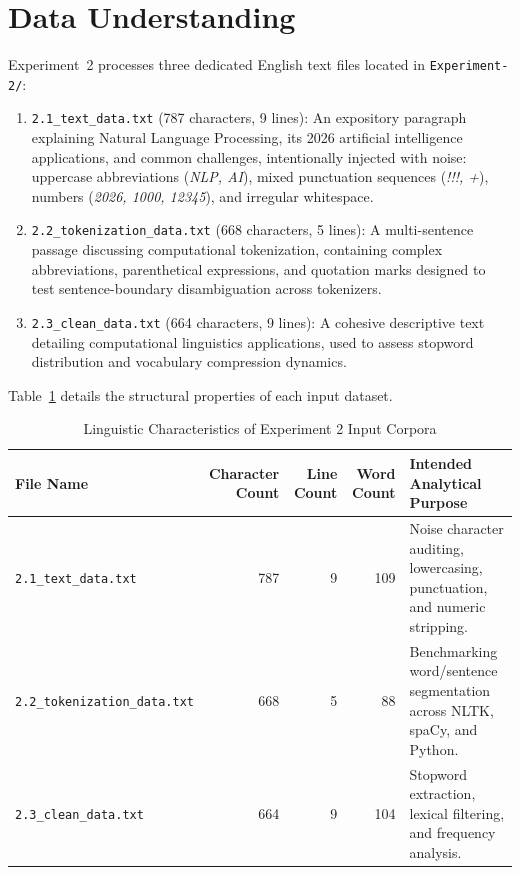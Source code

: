 \section{Data Understanding}
Experiment~2 processes three dedicated English text files located in \texttt{Experiment-2/}:
\begin{enumerate}
    \item \texttt{2.1\_text\_data.txt} (787 characters, 9 lines): An expository paragraph explaining Natural Language Processing, its 2026 artificial intelligence applications, and common challenges, intentionally injected with noise: uppercase abbreviations (\textit{NLP, AI}), mixed punctuation sequences (\textit{!!!, +}), numbers (\textit{2026, 1000, 12345}), and irregular whitespace.
    \item \texttt{2.2\_tokenization\_data.txt} (668 characters, 5 lines): A multi-sentence passage discussing computational tokenization, containing complex abbreviations, parenthetical expressions, and quotation marks designed to test sentence-boundary disambiguation across tokenizers.
    \item \texttt{2.3\_clean\_data.txt} (664 characters, 9 lines): A cohesive descriptive text detailing computational linguistics applications, used to assess stopword distribution and vocabulary compression dynamics.
\end{enumerate}

Table~\ref{tab:exp2_data_summary} details the structural properties of each input dataset.
\begin{table}[H]
\centering
\small
\caption{Linguistic Characteristics of Experiment 2 Input Corpora}
\label{tab:exp2_data_summary}
\begin{tabularx}{\textwidth}{lrrrp{5.5cm}}
\toprule
\textbf{File Name} & \textbf{Character Count} & \textbf{Line Count} & \textbf{Word Count} & \textbf{Intended Analytical Purpose} \\
\midrule
\texttt{2.1\_text\_data.txt} & 787 & 9 & 109 & Noise character auditing, lowercasing, punctuation, and numeric stripping. \\
\texttt{2.2\_tokenization\_data.txt} & 668 & 5 & 88 & Benchmarking word/sentence segmentation across NLTK, spaCy, and Python. \\
\texttt{2.3\_clean\_data.txt} & 664 & 9 & 104 & Stopword extraction, lexical filtering, and frequency analysis. \\
\bottomrule
\end{tabularx}
\end{table}

